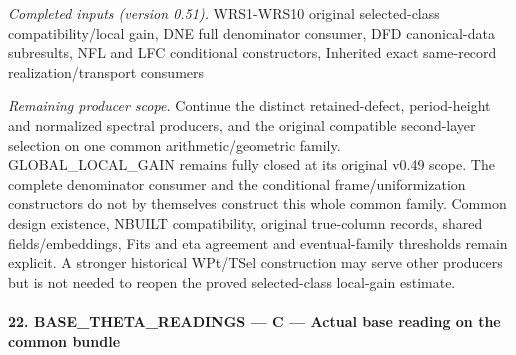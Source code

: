 \emph{Completed inputs (version 0.51).} WRS1-WRS10 original selected-class compatibility/local gain, DNE full denominator consumer, DFD canonical-data subresults, NFL and LFC conditional constructors, Inherited exact same-record realization/transport consumers

\emph{Remaining producer scope.} Continue the distinct retained-defect, period-height and normalized spectral producers, and the original compatible second-layer selection on one common arithmetic/geometric family. GLOBAL\_\allowbreak LOCAL\_\allowbreak GAIN remains fully closed at its original v0.49 scope. The complete denominator consumer and the conditional frame/uniformization constructors do not by themselves construct this whole common family. Common design existence, NBUILT compatibility, original true-column records, shared fields/embeddings, Fits and eta agreement and eventual-family thresholds remain explicit. A stronger historical WPt/TSel construction may serve other producers but is not needed to reopen the proved selected-class local-gain estimate.



\paragraph{22. BASE\_\allowbreak THETA\_\allowbreak READINGS — C — Actual base reading on the common bundle}


